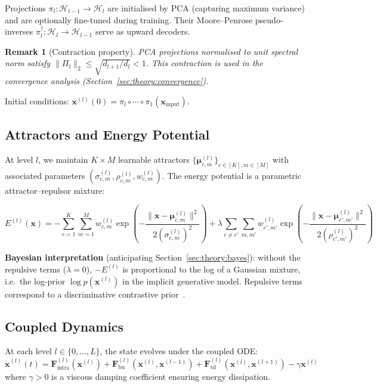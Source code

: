 \documentclass[11pt,a4paper]{article}
\newtheorem{remark}[theorem]{Remark}
\begin{document}
Projections $\pi_l : \mathcal{H}_{l-1} \to \mathcal{H}_l$ are initialised by PCA (capturing
maximum variance) and are optionally fine-tuned during training. Their Moore--Penrose
pseudo-inverses $\pi_l^\dagger : \mathcal{H}_l \to \mathcal{H}_{l-1}$ serve as upward
decoders.

\begin{remark}[Contraction property]
PCA projections normalised to unit spectral norm satisfy
$\|\Pi_l\|_2 \le \sqrt{d_{l+1}/d_l} < 1$.
This contraction is used in the convergence analysis (Section~\ref{sec:theory:convergence}).
\end{remark}

Initial conditions: $\mathbf{x}^{(l)}(0) = \pi_l \circ \cdots \circ \pi_1(\mathbf{x}_{\mathrm{input}})$.

\subsection{Attractors and Energy Potential}

At level $l$, we maintain $K \times M$ learnable attractors
$\{\boldsymbol{\mu}^{(l)}_{c,m}\}_{c \in [K], m \in [M]}$
with associated parameters $(\sigma^{(l)}_{c,m}, \rho^{(l)}_{c,m}, w^{(l)}_{c,m})$.
The energy potential is a parametric attractor--repulsor mixture:

\begin{equation}
  E^{(l)}(\mathbf{x}) = -\sum_{c=1}^{K} \sum_{m=1}^{M} w_{c,m}^{(l)}
    \exp\!\left(-\frac{\|\mathbf{x} - \boldsymbol{\mu}_{c,m}^{(l)}\|^2}
                      {2(\sigma_{c,m}^{(l)})^2}\right)
  + \lambda \sum_{c \ne c'} \sum_{m,m'} w_{c',m'}^{(l)}
    \exp\!\left(-\frac{\|\mathbf{x} - \boldsymbol{\mu}_{c',m'}^{(l)}\|^2}
                      {2(\rho_{c',m'}^{(l)})^2}\right)
\label{eq:energy}
\end{equation}

\textbf{Bayesian interpretation} (anticipating Section~\ref{sec:theory:bayes}):
without the repulsive terms ($\lambda=0$), $-E^{(l)}$ is proportional to the log of a
Gaussian mixture, i.e.\ the log-prior $\log p(\mathbf{x}^{(l)})$ in the implicit generative
model. Repulsive terms correspond to a discriminative contrastive
prior~\cite{larochelle2008}.

\subsection{Coupled Dynamics}

At each level $l \in \{0, \ldots, L\}$, the state evolves under the coupled ODE:
\begin{equation}
  \dot{\mathbf{x}}^{(l)}(t) =
  \mathbf{F}^{(l)}_{\mathrm{intra}}(\mathbf{x}^{(l)})
  + \mathbf{F}^{(l)}_{\mathrm{bu}}(\mathbf{x}^{(l)}, \mathbf{x}^{(l-1)})
  + \mathbf{F}^{(l)}_{\mathrm{td}}(\mathbf{x}^{(l)}, \mathbf{x}^{(l+1)})
  - \gamma \mathbf{x}^{(l)}
\label{eq:dynamics}
\end{equation}
where $\gamma > 0$ is a viscous damping coefficient ensuring energy dissipation.
\end{document}
